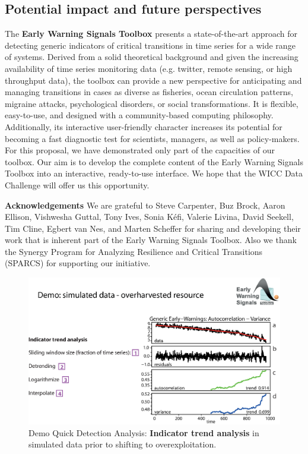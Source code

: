 \documentclass[12pt,a4paper,final]{article}
\begin{document}
\begin{doublespacing}
\section{Potential impact and future perspectives}
The \textbf{Early Warning Signals Toolbox} presents a state-of-the-art approach for detecting generic indicators of critical transitions in time series for a wide range of systems. Derived from a solid theoretical background and given the increasing availability of time series monitoring data (e.g. twitter, remote sensing, or high throughput data), the toolbox can provide a new perspective for anticipating and managing transitions in cases as diverse as fisheries, ocean circulation patterns, migraine attacks, psychological disorders, or social transformations. It is flexible, easy-to-use, and designed with a community-based computing philosophy. Additionally, its interactive user-friendly character increases its potential for becoming a fast diagnostic test for scientists, managers, as well as policy-makers. For this proposal, we have demonstrated only part of the capacities of our toolbox. Our aim is to develop the complete content of the Early Warning Signals Toolbox into an interactive, ready-to-use interface. We hope that the WICC Data Challenge will offer us this opportunity.\\

\end{doublespacing}
\newpage
{\small
\textbf{Acknowledgements}
We are grateful to Steve Carpenter, Buz Brock, Aaron Ellison, Vishwesha Guttal, Tony Ives, Sonia K\'{e}fi, Valerie Livina, David Seekell, Tim Cline, Egbert van Nes, and Marten Scheffer for sharing and developing their work that is inherent part of the Early Warning Signals Toolbox. Also we thank the Synergy Program for Analyzing Resilience and Critical Transitions  (SPARCS) for supporting our initiative.



}

\newpage
\begin{figure}[ht]
\begin{center}
\includegraphics[scale=0.8]{fig_3_simulated_generic.eps}
\caption{Demo Quick Detection Analysis: \textbf{Indicator trend analysis} in simulated data prior to shifting to overexploitation.}
\end{center}
\label{fig:simulated_generic}
\end{figure} 
\end{document}
